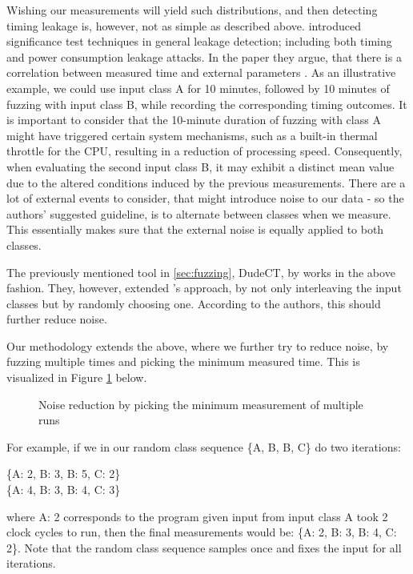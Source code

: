 Wishing our measurements will yield such distributions, and then detecting timing leakage is, however, not as simple as described above. \citeauthor{Coron_2004} introduced significance test techniques in general leakage detection; including both timing and power consumption leakage attacks. In the paper they argue, that there is a correlation between measured time and external parameters \citep{Coron_2004}. As an illustrative example, we could use input class A for 10 minutes, followed by 10 minutes of fuzzing with input class B, while recording the corresponding timing outcomes. It is important to consider that the 10-minute duration of fuzzing with class A might have triggered certain system mechanisms, such as a built-in thermal throttle for the CPU, resulting in a reduction of processing speed. Consequently, when evaluating the second input class B, it may exhibit a distinct mean value due to the altered conditions induced by the previous measurements. There are a lot of external events to consider, that might introduce noise to our data - so the authors' suggested guideline, is to alternate between classes when we measure. This essentially makes sure that the external noise is equally applied to both classes.

The previously mentioned tool in \ref{sec:fuzzing}, DudeCT, by \citeauthor{dudect} works in the above fashion. They, however, extended \citeauthor{Coron_2004}'s approach, by not only interleaving the input classes but by randomly choosing one. According to the authors, this should further reduce noise.

Our methodology extends the above, where we further try to reduce noise, by fuzzing multiple times and picking the minimum measured time. This is visualized in Figure \ref{fig:noisered} below. 
\begin{figure}[H]
    \centering
    
    \caption{Noise reduction by picking the minimum measurement of multiple runs}
    \label{fig:noisered}
\end{figure}
For example, if we in our random class sequence \{A, B, B, C\} do two iterations:
\begin{center}
    \{A: 2, B: 3, B: 5, C: 2\} \\
    \{A: 4, B: 3, B: 4, C: 3\}
\end{center}
where A: 2 corresponds to the program given input from input class A took 2 clock cycles to run, then the final measurements would be: \{A: 2, B: 3, B: 4, C: 2\}. Note that the random class sequence samples once and fixes the input for all iterations.

